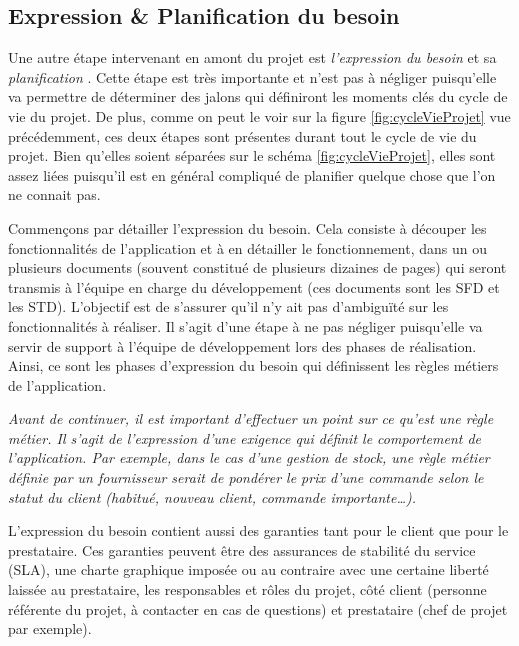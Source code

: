 
\subsection{Expression \& Planification du besoin}

Une autre étape intervenant en amont du projet est \emph{l'expression du besoin} et sa \emph{planification} . Cette étape est très importante et n'est pas à négliger puisqu'elle va permettre de déterminer des jalons qui définiront les moments clés du cycle de vie du projet. De plus, comme on peut le voir sur la figure \ref{fig:cycleVieProjet} vue précédemment, ces deux étapes sont présentes durant tout le cycle de vie du projet. Bien qu'elles soient séparées sur le schéma \ref{fig:cycleVieProjet}, elles sont assez liées puisqu'il est en général compliqué de planifier quelque chose que l'on ne connait pas.

Commençons par détailler l'expression du besoin. Cela consiste à découper les fonctionnalités de l'application et à en détailler le fonctionnement, dans un ou plusieurs documents (souvent constitué de plusieurs dizaines de pages) qui seront transmis à l'équipe en charge du développement (ces documents sont les \gls{SFD} et les \gls{STD}). L'objectif est de s'assurer qu'il n'y ait pas d'ambiguïté sur les fonctionnalités à réaliser. Il s'agit d'une étape à ne pas négliger puisqu'elle va servir de support à l'équipe de développement lors des phases de réalisation. Ainsi, ce sont les phases d'expression du besoin qui définissent les règles métiers de l'application. 

{\em
Avant de continuer, il est important d'effectuer un point sur ce qu'est une règle métier. Il s'agit de l'expression d'une exigence qui définit le comportement de l'application. Par exemple, dans le cas d'une gestion de stock, une règle métier définie par un fournisseur serait de pondérer le prix d'une commande selon le statut du client (habitué, nouveau client, commande importante\ldots).
}

L'expression du besoin contient aussi des garanties tant pour le client que pour le prestataire. Ces garanties peuvent être des assurances de stabilité du service (\gls{SLA}), une charte graphique imposée ou au contraire avec une certaine liberté laissée au prestataire, les responsables et rôles du projet, côté client (personne référente du projet, à contacter en cas de questions) et prestataire (chef de projet par exemple).

